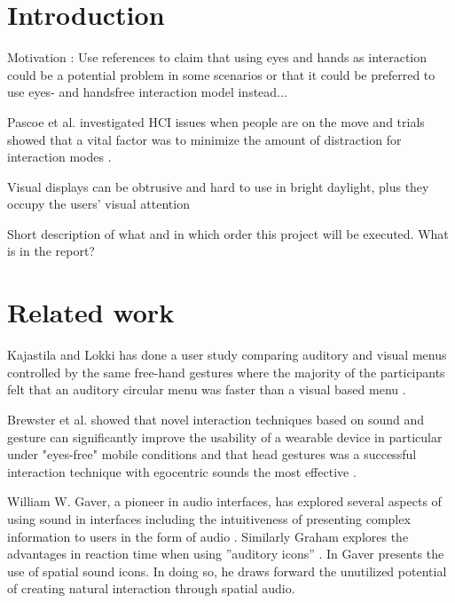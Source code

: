 \documentclass{article}
\begin{document}
\clearpage

\tableofcontents

\clearpage

\section{Introduction}
Motivation : Use references to claim that using eyes and hands as interaction could be a potential problem in some scenarios or that it could be preferred to use eyes- and handsfree interaction model instead...

Pascoe et al. investigated HCI issues when people are on the move and trials showed that a vital factor was to minimize the amount of distraction for interaction modes \cite{pascoe_using_2000}.

Visual displays can be obtrusive and hard to use in bright daylight, plus they occupy the users’ visual attention \cite{geelhoed_safety_2000}

Short description of what and in which order this project will be executed. What is in the report?


\section{Related work}
Kajastila and Lokki has done a user study comparing auditory and visual menus controlled by the same free-hand gestures where the majority of the participants felt that an auditory circular menu was faster than a visual based menu \cite{kajastila_interaction_2013}.

Brewster et al. showed that novel interaction techniques based on sound and gesture can significantly improve the usability of a wearable device in particular under "eyes-free" mobile conditions and that head gestures was a successful interaction technique with egocentric sounds the most effective \cite{brewster_multimodaleyes-freeinteraction_2003}.

William W. Gaver, a pioneer in audio interfaces, has explored several aspects of using sound in interfaces including the intuitiveness of presenting complex information to users in the form of audio \cite{gaver_sonicfinder:_1989}. Similarly Graham explores the advantages in reaction time when using ”auditory icons” \cite{graham_use_1999}. In \cite{gaver_auditory_1986} Gaver presents the use of spatial sound icons. In doing so, he draws forward the unutilized potential of creating natural interaction through spatial audio.
\end{document}

